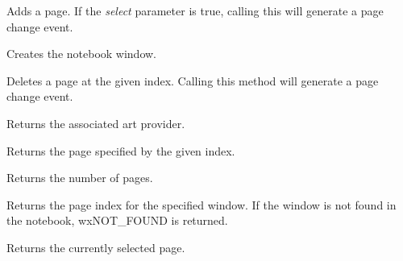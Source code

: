 Adds a page.  If the {\it select} parameter is true, calling this will generate a page change event.

\label{wxauinotebookcreate}


Creates the notebook window.

\label{wxauinotebookdeletepage}


Deletes a page at the given index.  Calling this method will generate a page change event.

\label{wxauinotebookgetartprovider}


Returns the associated art provider.

\label{wxauinotebookgetpage}


Returns the page specified by the given index.

\label{wxauinotebookgetpagecount}


Returns the number of pages.

\label{wxauinotebookgetpageindex}


Returns the page index for the specified window.  If the window is not found in the notebook, wxNOT_FOUND is returned.

\label{wxauinotebookgetselection}


Returns the currently selected page.

\label{wxauinotebookinsertpage}


